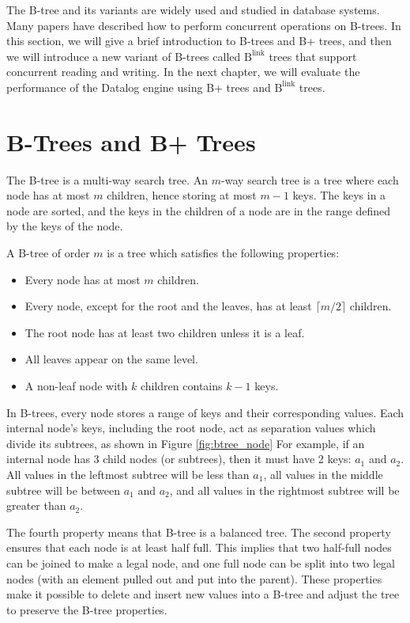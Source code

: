 \documentclass[11pt]{report}
\theoremstyle{definition}
\begin{document}
The B-tree and its variants are widely used and studied in database systems. Many papers have described how to perform concurrent operations on B-trees. In this section, we will give a brief introduction to B-trees and B+ trees, and then we will introduce a new variant of B-trees called $\text{B}^{\text{link}}$ trees that support concurrent reading and writing. In the next chapter, we will evaluate the performance of the Datalog engine using B+ trees and $\text{B}^{\text{link}}$ trees.

\section{B-Trees and B+ Trees}
\label{sec:btrees}

The B-tree is a multi-way search tree. An $m$-way search tree is a tree where each node has at most $m$ children, hence storing at most $m-1$ keys. The keys in a node are sorted, and the keys in the children of a node are in the range defined by the keys of the node.

A B-tree of order $m$ is a tree which satisfies the following properties:
\begin{itemize}
  \item Every node has at most $m$ children.
  \item Every node, except for the root and the leaves, has at least $\lceil m/2 \rceil$ children.
  \item The root node has at least two children unless it is a leaf.
  \item All leaves appear on the same level.
  \item A non-leaf node with $k$ children contains $k-1$ keys.
\end{itemize}

In B-trees, every node stores a range of keys and their corresponding values. Each internal node's keys, including the root node, act as separation values which divide its subtrees, as shown in Figure \ref{fig:btree_node} For example, if an internal node has 3 child nodes (or subtrees), then it must have 2 keys: $a_1$ and $a_2$. All values in the leftmost subtree will be less than $a_1$, all values in the middle subtree will be between $a_1$ and $a_2$, and all values in the rightmost subtree will be greater than $a_2$.

The fourth property means that B-tree is a balanced tree. The second property ensures that each node is at least half full. This implies that two half-full nodes can be joined to make a legal node, and one full node can be split into two legal nodes (with an element pulled out and put into the parent). These properties make it possible to delete and insert new values into a B-tree and adjust the tree to preserve the B-tree properties.
\end{document}
